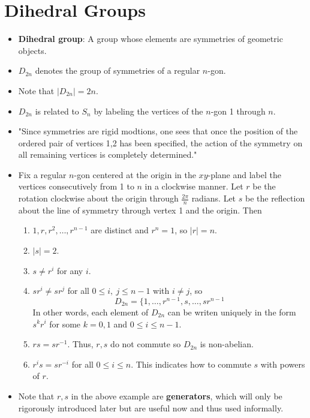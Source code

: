 \documentclass[../notes.tex]{subfiles}
\begin{document}
\section{Dihedral Groups}
\begin{itemize}
    \item \textbf{Dihedral group}: A group whose elements are symmetries of geometric objects.
    \item $D_{2n}$ denotes the group of symmetries of a regular $n$-gon.
    \item Note that $|D_{2n}|=2n$.
    \item $D_{2n}$ is related to $S_n$ by labeling the vertices of the $n$-gon 1 through $n$.
    \item "Since symmetries are rigid modtions, one sees that once the position of the ordered pair of vertices 1,2 has been specified, the action of the symmetry on all remaining vertices is completely determined."
    \item Fix a regular $n$-gon centered at the origin in the $xy$-plane and label the vertices consecutively from 1 to $n$ in a clockwise manner. Let $r$ be the rotation clockwise about the origin through $\frac{2\pi}{n}$ radians. Let $s$ be the reflection about the line of symmetry through vertex 1 and the origin. Then
    \begin{enumerate}[label={\textbf{(\arabic*)}}]
        \item $1,r,r^2,\dots,r^{n-1}$ are distinct and $r^n=1$, so $|r|=n$.
        \item $|s|=2$.
        \item $s\neq r^i$ for any $i$.
        \item $sr^i\neq sr^j$ for all $0\leq i,\ j\leq n-1$ with $i\neq j$, so
        \begin{equation*}
            D_{2n} = \{1,\dots,r^{n-1},s,\dots,sr^{n-1}
        \end{equation*}
        In other words, each element of $D_{2n}$ can be writen uniquely in the form $s^kr^i$ for some $k=0,1$ and $0\leq i\leq n-1$.
        \item $rs=sr^{-1}$. Thus, $r,s$ do not commute so $D_{2n}$ is non-abelian.
        \item $r^is=sr^{-i}$ for all $0\leq i\leq n$. This indicates how to commute $s$ with powers of $r$.
    \end{enumerate}
    \item Note that $r,s$ in the above example are \textbf{generators}, which will only be rigorously introduced later but are useful now and thus used informally.

\end{itemize}
\end{document}
